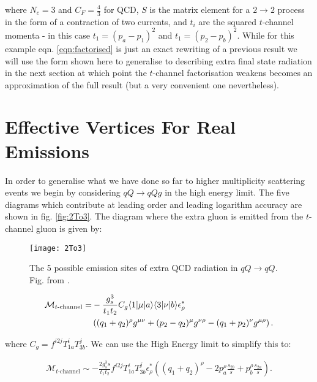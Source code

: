 		where $N_c=3$ and $C_F=\frac{4}{3}$ for QCD, $S$ is the matrix element for a $2\rightarrow2$ process
		in the form of a contraction of two currents, and $t_i$ are the squared $t$-channel momenta - in this
		case $t_1=(p_a-p_1)^2$ and $t_1=(p_2-p_b)^2$.  While for this example eqn. \eqref{eqn:factorised} is
		just an exact rewriting of a previous result we will use the form shown here to generalise to describing extra
		final state radiation in the next section at which point the $t$-channel factorisation weakens becomes an
		approximation of the full result (but a very convenient one nevertheless).

	\section{Effective Vertices For Real Emissions}
		\label{sub:effective_vertices_for_real_emissions}

		In order to generalise what we have done so far to higher multiplicity scattering events we begin
		by considering $qQ\rightarrow qQg$ in the high energy limit.  The five diagrams which contribute at
		leading order and leading logarithm accuracy are shown in fig. \eqref{fig:2To3}.  The diagram
		where the extra gluon is emitted from the $t$-channel gluon is given by:

		\begin{figure}[hbt]
			\begin{center}
			\texttt{[image: 2To3]}
			\caption{The 5 possible emission sites of extra QCD radiation in $qQ\rightarrow qQ$.
			Fig. from \cite{Andersen:2009nu}.}
			\label{fig:2To3}
			\end{center}
		\end{figure}

		\begin{align}
			\mathcal{M}_{t\text{-channel}} = &-\frac{g_s^3}{t_1t_2}C_g\langle 1 | \mu | a \rangle\langle 3 | \nu | b \rangle
			\epsilon^*_\rho\\&\left((q_1 + q_2)^\rho g^{\mu\nu} + (p_2 - q_2)^\mu g^{\nu\rho} - (q_1 + p_2)^\nu g^{\mu\rho}\right).
		\end{align}

		where $C_g = f^{i2j}T^i_{1a}T^j_{3b}$.  We can use the High Energy limit to simplify this to:

		\begin{align}
			\mathcal{M}_{t\text{-channel}} \sim -\frac{2g_s^3s}{t_1t_2}f^{i2j}T^i_{1a}T^j_{3b}\epsilon^*_\rho
			\left((q_1 + q_2)^\rho - 2p_a^\rho\frac{s_{2b}}{s} + p_b^\rho\frac{s_{2a}}{s}\right).
		\end{align}

